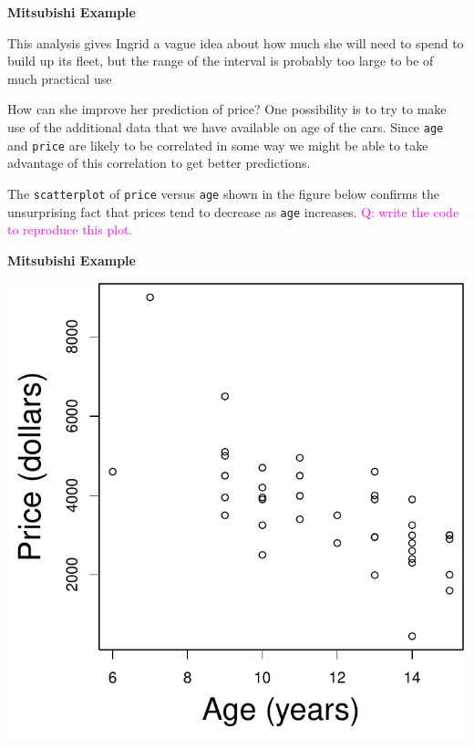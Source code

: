 \documentclass[landscape]{slides}
\newcommand{\heading}[1]{%
  \begin{center}
    \large\bf \color{red}
        #1
  \end{center}
  \vspace{1ex minus 1ex}}
\begin{document}
\begin{slide}
\heading{Mitsubishi Example}

This analysis gives Ingrid a vague idea about how much she will need to spend to 
build up its fleet, but the range of the interval is probably too large to 
be of much practical use

How can she improve her prediction of price? One possibility is to try to 
make use of the additional data that we have available on age of the cars.
Since {\tt age} and {\tt price} are likely to be correlated in some way
we might be able to take advantage of this correlation to get better predictions.

The {\tt scatterplot} of {\tt price} versus {\tt age} shown in the figure below
confirms the unsurprising fact that prices tend to decrease  as {\tt age} 
increases. \textcolor{magenta}{Q: write the code to reproduce this plot.}

\end{slide}
\begin{slide}
\heading{Mitsubishi Example}

\begin{center}
\includegraphics{figures/7-LinearModels-Figures/ageprice.pdf}
\end{center}
\end{slide}
\end{document}
